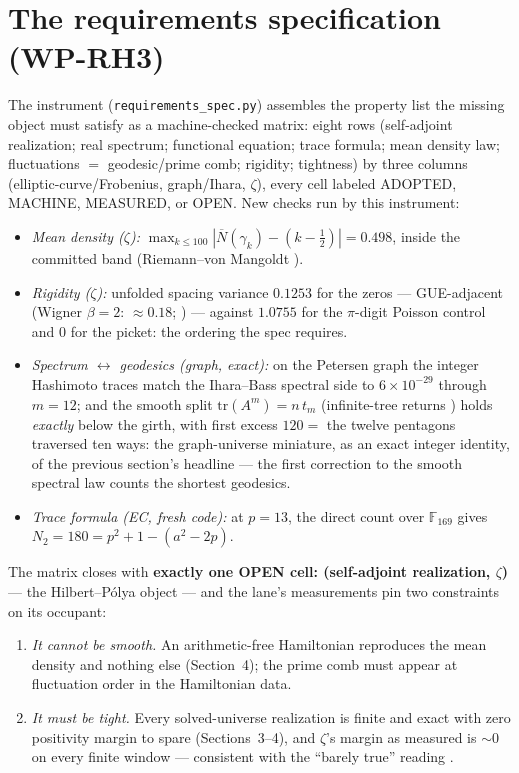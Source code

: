 \documentclass[11pt]{article}
\theoremstyle{remark}
\newcommand{\Nbar}{\overline{N}}
\begin{document}
\section{The requirements specification (WP-RH3)}

The instrument (\texttt{requirements\_spec.py}) assembles the property list the missing object must
satisfy as a machine-checked matrix: eight rows (self-adjoint realization; real spectrum; functional
equation; trace formula; mean density law; fluctuations $=$ geodesic/prime comb; rigidity;
tightness) by three columns (elliptic-curve/Frobenius, graph/Ihara, $\zeta$), every cell labeled
ADOPTED, MACHINE, MEASURED, or OPEN. New checks run by this instrument:

\begin{itemize}
\item[--] \emph{Mean density ($\zeta$):} $\max_{k\le100} |\Nbar(\gamma_k) - (k - \tfrac12)| =
0.498$, inside the committed band (Riemann--von Mangoldt \cite{Edwards}).
\item[--] \emph{Rigidity ($\zeta$):} unfolded spacing variance $0.1253$ for the zeros ---
GUE-adjacent (Wigner $\beta=2$: $\approx 0.18$; \cite{Montgomery,Odlyzko}) --- against $1.0755$ for
the $\pi$-digit Poisson control and $0$ for the picket: the ordering the spec requires.
\item[--] \emph{Spectrum $\leftrightarrow$ geodesics (graph, exact):} on the Petersen graph the
integer Hashimoto traces match the Ihara--Bass spectral side \cite{Bass,Terras} to $6\times10^{-29}$
through $m = 12$; and the smooth split $\mathrm{tr}(A^m) = n\,t_m$ (infinite-tree returns
\cite{KestenMcKay}) holds \emph{exactly} below the girth, with first excess $120 = $ the twelve
pentagons traversed ten ways: the graph-universe miniature, as an exact integer identity, of the
previous section's headline --- the first correction to the smooth spectral law counts the shortest
geodesics.
\item[--] \emph{Trace formula (EC, fresh code):} at $p = 13$, the direct count over
$\mathbb F_{169}$ gives $N_2 = 180 = p^2 + 1 - (a^2 - 2p)$.
\end{itemize}

The matrix closes with \textbf{exactly one OPEN cell: (self-adjoint realization, $\zeta$)} --- the
Hilbert--P\'olya object \cite{BerryKeating,Connes} --- and the lane's measurements pin two
constraints on its occupant:
\begin{enumerate}
\item \emph{It cannot be smooth.} An arithmetic-free Hamiltonian reproduces the mean density and
nothing else (Section~4); the prime comb must appear at fluctuation order in the Hamiltonian data.
\item \emph{It must be tight.} Every solved-universe realization is finite and exact with zero
positivity margin to spare (Sections~3--4), and $\zeta$'s margin as measured is $\sim 0$ on every
finite window --- consistent with the ``barely true'' reading \cite{RodgersTao}.
\end{enumerate}
\end{document}
